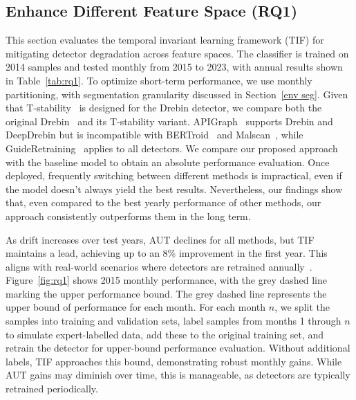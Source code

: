 \vspace{-0.5cm}

\subsection{Enhance Different Feature Space (RQ1)}
\label{rq1}
This section evaluates the temporal invariant learning framework (TIF) for mitigating detector degradation across feature spaces. The classifier is trained on 2014 samples and tested monthly from 2015 to 2023, with annual results shown in Table~\ref{tab:rq1}. To optimize short-term performance, we use monthly partitioning, with segmentation granularity discussed in Section~\ref{env seg}. Given that T-stability~\cite{svm_ce} is designed for the Drebin detector, we compare both the original Drebin~\cite{Arpdrebin} and its T-stability variant. APIGraph~\cite{apigraph} supports Drebin and DeepDrebin but is incompatible with BERTroid~\cite{bertroid} and Malscan~\cite{malscan}, while GuideRetraining~\cite{guide_retraining} applies to all detectors. We compare our proposed approach with the baseline model to obtain an absolute performance evaluation. Once deployed, frequently switching between different methods is impractical, even if the model doesn't always yield the best results. Nevertheless, our findings show that, even compared to the best yearly performance of other methods, our approach consistently outperforms them in the long term.

As drift increases over test years, AUT declines for all methods, but TIF maintains a lead, achieving up to an 8\% improvement in the first year. This aligns with real-world scenarios where detectors are retrained annually~\cite{apigraph}. Figure~\ref{fig:rq1} shows 2015 monthly performance, with the grey dashed line marking the upper performance bound. The grey dashed line represents the upper bound of performance for each month. For each month $n$, we split the samples into training and validation sets, label samples from months 1 through $n$ to simulate expert-labelled data, add these to the original training set, and retrain the detector for upper-bound performance evaluation. Without additional labels, TIF approaches this bound, demonstrating robust monthly gains. While AUT gains may diminish over time, this is manageable, as detectors are typically retrained periodically.


\begin{center}
\end{center}




